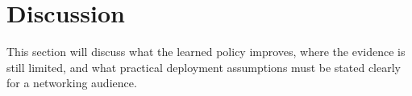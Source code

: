 \section{Discussion}

This section will discuss what the learned policy improves, where the evidence
is still limited, and what practical deployment assumptions must be stated
clearly for a networking audience.
